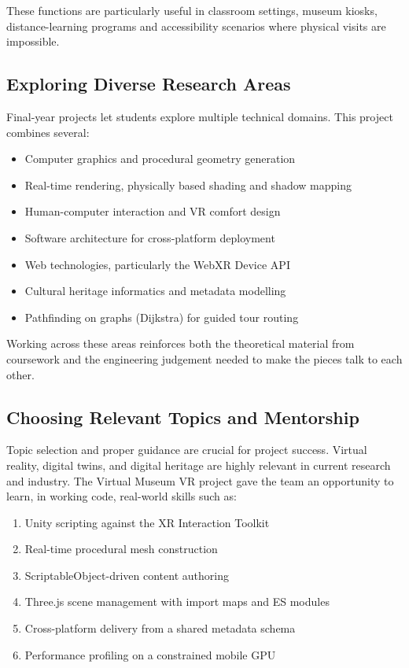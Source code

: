 These functions are particularly useful in classroom settings, museum kiosks, distance-learning programs and accessibility scenarios where physical visits are impossible.

\subsection{Exploring Diverse Research Areas}

Final-year projects let students explore multiple technical domains. This project combines several:

\begin{itemize}
\item Computer graphics and procedural geometry generation
\item Real-time rendering, physically based shading and shadow mapping
\item Human-computer interaction and VR comfort design
\item Software architecture for cross-platform deployment
\item Web technologies, particularly the WebXR Device API
\item Cultural heritage informatics and metadata modelling
\item Pathfinding on graphs (Dijkstra) for guided tour routing
\end{itemize}

Working across these areas reinforces both the theoretical material from coursework and the engineering judgement needed to make the pieces talk to each other.

\subsection{Choosing Relevant Topics and Mentorship}

Topic selection and proper guidance are crucial for project success. Virtual reality, digital twins, and digital heritage are highly relevant in current research and industry. The Virtual Museum VR project gave the team an opportunity to learn, in working code, real-world skills such as:

\begin{enumerate}
\item Unity scripting against the XR Interaction Toolkit
\item Real-time procedural mesh construction
\item ScriptableObject-driven content authoring
\item Three.js scene management with import maps and ES modules
\item Cross-platform delivery from a shared metadata schema
\item Performance profiling on a constrained mobile GPU
\end{enumerate}

